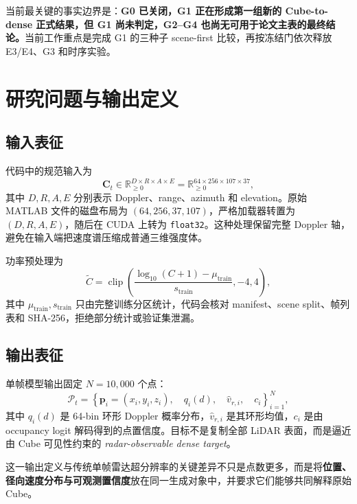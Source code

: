 \documentclass[11pt,a4paper,fontset=none]{ctexart}
\newcommand{\code}[1]{\texttt{#1}}
\begin{document}
当前最关键的事实边界是：\textbf{G0 已关闭，G1 正在形成第一组新的 Cube-to-dense 正式结果，但 G1 尚未判定，G2--G4 也尚无可用于论文主表的最终结论。}当前工作重点是完成 G1 的三种子 scene-first 比较，再按冻结门依次释放 E3/E4、G3 和时序实验。

\section{研究问题与输出定义}

\subsection{输入表征}

代码中的规范输入为
\begin{equation}
  \mathbf{C}_t \in \mathbb{R}_{\ge 0}^{D\times R\times A\times E}
  = \mathbb{R}_{\ge 0}^{64\times256\times107\times37},
\end{equation}
其中 $D,R,A,E$ 分别表示 Doppler、range、azimuth 和 elevation。原始 MATLAB 文件的磁盘布局为
$(64,256,37,107)$，严格加载器转置为 $(D,R,A,E)$，随后在 CUDA 上转为 \code{float32}。这种处理保留完整 Doppler 轴，避免在输入端把速度谱压缩成普通三维强度体。

功率预处理为
\begin{equation}
  \widetilde{C}=\operatorname{clip}\left(
  \frac{\log_{10}(C+1)-\mu_{\mathrm{train}}}{s_{\mathrm{train}}},-4,4
  \right),
\end{equation}
其中 $\mu_{\mathrm{train}},s_{\mathrm{train}}$ 只由完整训练分区统计，代码会核对 manifest、scene split、帧列表和 SHA-256，拒绝部分统计或验证集泄漏。

\subsection{输出表征}

单帧模型输出固定 $N=10{,}000$ 个点：
\begin{equation}
  \mathcal{P}_t=\left\{
  \mathbf{p}_i=(x_i,y_i,z_i),\quad
  q_i(d),\quad
  \hat v_{r,i},\quad
  c_i
  \right\}_{i=1}^{N},
\end{equation}
其中 $q_i(d)$ 是 64-bin 环形 Doppler 概率分布，$\hat v_{r,i}$ 是其环形均值，$c_i$ 是由 occupancy logit 解码得到的点置信度。目标不是复制全部 LiDAR 表面，而是逼近由 Cube 可见性约束的 \emph{radar-observable dense target}。

这一输出定义与传统单帧雷达超分辨率的关键差异不只是点数更多，而是将\textbf{位置、径向速度分布与可观测置信度}放在同一生成对象中，并要求它们能够共同解释原始 Cube。
\end{document}
